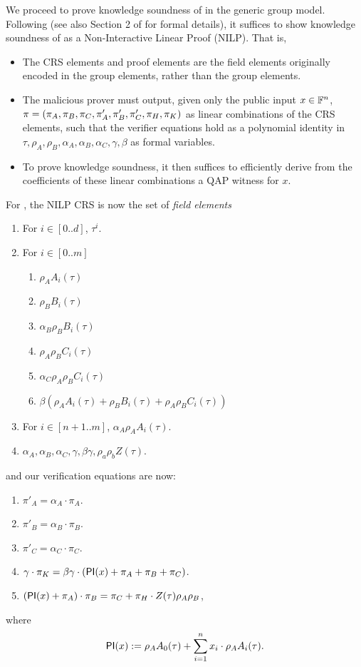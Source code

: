 \documentclass[11pt]{article}
\numberwithin{figure}{section} %
\begin{document}
We proceed to prove knowledge soundness of \bctvprime in the generic group model.
Following \cite{groth16} (see also Section 2 of \cite{BG18} for formal details), it suffices to show knowledge
soundness of \bctvprime as a Non-Interactive Linear Proof (NILP). That is, 
\begin{itemize}
\item The CRS elements and proof elements are the field elements originally encoded in the group elements, rather than the group elements.
\item The malicious prover must output, given only the public input $x\in\mathbb F^n$, $\pi = (\pi_A,\pi_B,\pi_C,\pi'_A,\pi'_B,\pi'_C,\pi_H,\pi_K)$ as linear combinations of the CRS elements, such that the verifier equations hold as a polynomial identity in 
$\tau,\rho_A,\rho_B,\alpha_A,\alpha_B,\alpha_C,\gamma,\beta$ as formal variables.
\item To prove knowledge soundness, it then suffices to efficiently derive from the coefficients of these linear combinations a QAP witness for $x$.
\end{itemize}

For \bctvprime, the NILP CRS is now the set of \emph{field elements}

\begin{enumerate}
 \item For $i\in [0..d]$, $\tau^i$.
 \item For $i\in [0..m]$ 
 
 \begin{enumerate}
  \item $\rho_A A_i(\tau)$
\item $\rho_B B_i(\tau)$
\item $\alpha_B\rho_B B_i(\tau)$
\item $\rho_A\rho_B C_i(\tau)$
\item $\alpha_C \rho_A\rho_B C_i(\tau)$ 
\item $\beta(\rho_A A_i(\tau) + \rho_B B_i(\tau) + \rho_A\rho_B C_i(\tau))$ 
\end{enumerate}
\item For $i\in [n+1..m]$, $\alpha_A\rho_A A_i(\tau)$.

\item $\alpha_A,\alpha_B,\alpha_C,\gamma,\beta\gamma,\rho_a\rho_b Z(\tau)$.
\end{enumerate}

and our verification equations are now:
\begin{enumerate}
 \item $\pi'_A= \alpha_A\cdot \pi_A$.
\item $\pi'_B=\alpha_B\cdot \pi_B$.
\item $\pi'_C=\alpha_C\cdot \pi_C$.
\item $\gamma\cdot \pi_K =\beta\gamma\cdot (\mathsf{PI}(x)+\pi_A+\pi_B+\pi_C)$.
\item $(\mathsf{PI}(x)+\pi_A)\cdot \pi_B= \pi_C + \pi_H\cdot Z(\tau)\rho_A\rho_B$,
 \end{enumerate}
where
\[\mathsf{PI}(x):= \rho_A A_0(\tau) + \sum_{i=1}^n x_i\cdot \rho_A A_i(\tau) .\]
 
\end{document}
